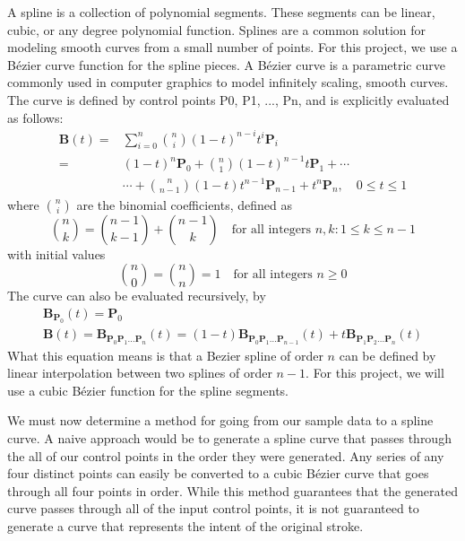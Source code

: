 A spline is a collection of polynomial segments.
These segments can be linear, cubic, or any degree polynomial function.
Splines are a common solution for modeling smooth curves from a small number of points.
For this project, we use a Bézier curve function for the spline pieces.
A Bézier curve is a parametric curve commonly used in computer graphics to model infinitely scaling, smooth curves.
The curve is defined by control points P0, P1, ..., Pn, and is explicitly evaluated as follows:
\begin{align}
  \mathbf{B}(t) = {} &\sum_{i=0}^n {n\choose i}(1 - t)^{n - i}t^i\mathbf{P}_i \\
                = {} &(1 - t)^n\mathbf{P}_0 + {n\choose 1}(1 - t)^{n - 1}t\mathbf{P}_1 + \cdots \\
                  {} &\cdots + {n\choose n - 1}(1 - t)t^{n - 1}\mathbf{P}_{n - 1} + t^n\mathbf{P}_n,\quad 0 \le t \le 1
\end{align}
where $\scriptstyle {n \choose i}$ are the binomial coefficients, defined as
\begin{equation}
\binom nk = \binom{n-1}{k-1} + \binom{n-1}k \quad \text{for all integers }n,k : 1\le k\le n-1
\end{equation}
with initial values 
\begin{equation}
\binom n0 = \binom nn = 1 \quad \text{for all integers } n\ge0
\end{equation}
The curve can also be evaluated recursively, by
\begin{align}
\mathbf{B}_{\mathbf{P}_0}(t) = \mathbf{P}_0 \\
\mathbf{B}(t) = \mathbf{B}_{\mathbf{P}_0\mathbf{P}_1\ldots\mathbf{P}_n}(t) = (1-t)\mathbf{B}_{\mathbf{P}_0\mathbf{P}_1\ldots\mathbf{P}_{n-1}}(t) + t\mathbf{B}_{\mathbf{P}_1\mathbf{P}_2\ldots\mathbf{P}_n}(t)
\end{align}
What this equation means is that a Bezier spline of order $n$ can be defined by linear interpolation between two splines of order $n - 1$.
For this project, we will use a cubic Bézier function for the spline segments.

We must now determine a method for going from our sample data to a spline curve.
A naive approach would be to generate a spline curve that passes through the all of our control points in the order they were generated.
Any series of any four distinct points can easily be converted to a cubic Bézier curve that goes through all four points in order.
While this method guarantees that the generated curve passes through all of the input control points, it is not guaranteed to generate a curve that represents the intent of the original stroke.

